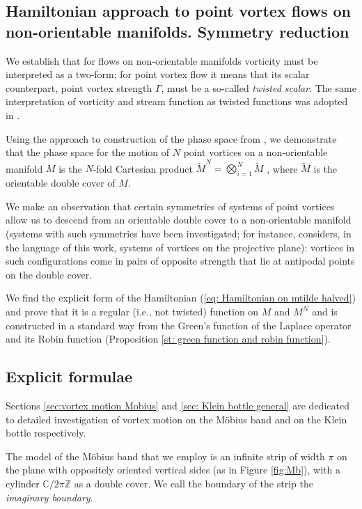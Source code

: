 \documentclass[11pt,twoside]{article}
\theoremstyle{definition}
\numberwithin{equation}{section}
\def\Mt{\widetilde{M}}
\begin{document}
\subsection*{Hamiltonian approach to point vortex flows on non-orientable manifolds. Symmetry  reduction}
   


   
 We establish that for flows on non-orientable manifolds vorticity must be interpreted as a two-form; for point vortex flow it means that its scalar counterpart, point vortex strength $\Gamma$, must be a so-called \textit{twisted scalar}. The same interpretation of vorticity and stream function as twisted functions was adopted in \cite{vanneste2021vortex}.

 
 Using the approach to construction of the phase space from \cite{Marsden-Weinstein-Vortices}, we demonstrate that the phase space for the motion of $N$ point vortices on a non-orientable manifold $M$ is the $N$-fold Cartesian product $\Mt^N = \bigotimes_{i=1}^N\Mt$ , where $\Mt$ is the orientable double cover of $M$.
   
   We make an observation that certain symmetries of systems of point vortices allow us to descend from an orientable double cover to a non-orientable manifold (systems with such symmetries have been investigated; for instance, \cite{laurent2001point} considers, in the language of this work, systems of vortices on the projective plane): vortices in such configurations come in pairs of opposite strength that lie at antipodal points on the double cover. 

We find the explicit form of the Hamiltonian (\ref{eq: Hamiltonian on mtilde halved}) and prove that it is a regular (i.e., not twisted) function on $M$ and $M^N$ and is  constructed in a standard way from the Green's function of the Laplace operator and its Robin function (Proposition \ref{st: green function and robin function}). 

   \subsection*{Explicit formulae}
Sections \ref{sec:vortex motion Mobius} and \ref{sec: Klein bottle general} are dedicated to detailed investigation of vortex motion on the M\"obius band and on the Klein bottle respectively.
   
   The model of the M\"obius band that we employ is an infinite strip of width $\pi$ on the plane with oppositely oriented vertical sides (as in Figure \ref{fig:Mb}), with a cylinder $\mathbb{C}/2\pi\mathbb{Z}$ as a double cover. We call the boundary of the strip the \textit{imaginary boundary}.
   
\end{document}
